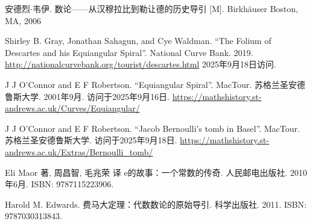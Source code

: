 安德烈$\cdot$韦伊. 数论——从汉穆拉比到勒让德的历史导引 [M]. Birkhäuser Boston, MA, 2006 %

Shirley B. Gray, Jonathan Sahagun, and Cye Waldman. ``The Folium of Descartes and his Equiangular Spiral''. National Curve Bank. 2019. \url{http://nationalcurvebank.org/tourist/descartes.html} 2025年9月18日访问.

J J O'Connor and E F Robertson. ``Equiangular Spiral''. MacTour. 苏格兰圣安德鲁斯大学. 2001年9月. 访问于2025年9月16日. \url{https://mathshistory.st-andrews.ac.uk/Curves/Equiangular/}

J J O'Connor and E F Robertson. ``Jacob Bernoulli's tomb in Basel''. MacTour. 苏格兰圣安德鲁斯大学. 访问于2025年9月18日. \url{https://mathshistory.st-andrews.ac.uk/Extras/Bernoulli_tomb/}

Eli Maor 著, 周昌智, 毛兆荣 译 e的故事：一个常数的传奇. 人民邮电出版社. 2010年6月. ISBN: 9787115223906.

Harold M. Edwards. 费马大定理：代数数论的原始导引. 科学出版社. 2011. ISBN: 9787030313843.
